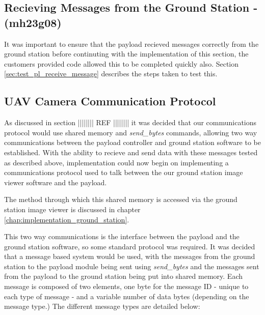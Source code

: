 \subsection{Recieving Messages from the Ground Station - (mh23g08)}
It was important to ensure that the payload recieved messages correctly from the ground
station before continuting with the implementation of this section, the customers provided code
allowed this to be completed quickly also. Section \ref{sec:test_pl_receive_message} describes 
the steps taken to test this.

\subsection{UAV Camera Communication Protocol}
As discussed in section |||||||| REF |||||||| it was decided that 
our communications protocol would use shared memory and \emph{send\_bytes} 
commands, allowing two way communications between the payload controller and 
ground station software to be established. With the ability to recieve and send data
with these messages tested as described above, implementation could now begin on
implementing a communications protocol used to talk between the our ground station 
image viewer software and the payload.

The method through which this shared memory is accessed via the ground station
image viewer is discussed in chapter \ref{chap:implementation_ground_station}.


This two way communications is the interface between the payload and the 
ground station software, so some standard protocol was required. It was decided
that a message based system would be used, with the messages from the ground
station to the payload module being sent using \emph{send\_bytes} and the 
messages sent from the payload to the ground station being put into shared
memory. Each message is composed of two elements, one byte for the message ID 
- unique to each type of message - and a variable number of data bytes 
(depending on the message type.) The different message types are detailed 
below:


